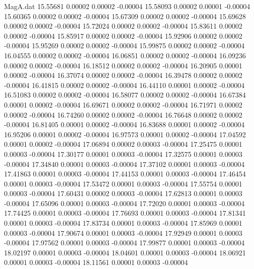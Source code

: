 \begin{filecontents}{MagA.dat}
  15.55681    0.00002    0.00002   -0.00004
  15.58093    0.00002    0.00001   -0.00004
  15.60365    0.00002    0.00002   -0.00004
  15.67309    0.00002    0.00002   -0.00004
  15.69628    0.00002    0.00002   -0.00004
  15.72024    0.00002    0.00002   -0.00004
  15.83611    0.00002    0.00002   -0.00004
  15.85917    0.00002    0.00002   -0.00004
  15.92906    0.00002    0.00002   -0.00004
  15.95269    0.00002    0.00002   -0.00004
  15.99875    0.00002    0.00002   -0.00004
  16.04555    0.00002    0.00002   -0.00004
  16.06851    0.00002    0.00002   -0.00004
  16.09236    0.00002    0.00002   -0.00004
  16.18512    0.00002    0.00002   -0.00004
  16.20905    0.00001    0.00002   -0.00004
  16.37074    0.00002    0.00002   -0.00004
  16.39478    0.00002    0.00002   -0.00004
  16.41815    0.00002    0.00002   -0.00004
  16.44110    0.00001    0.00002   -0.00004
  16.51083    0.00002    0.00002   -0.00004
  16.58077    0.00002    0.00002   -0.00004
  16.67384    0.00001    0.00002   -0.00004
  16.69671    0.00002    0.00002   -0.00004
  16.71971    0.00002    0.00002   -0.00004
  16.74260    0.00002    0.00002   -0.00004
  16.76648    0.00002    0.00002   -0.00004
  16.81405    0.00001    0.00002   -0.00004
  16.83688    0.00001    0.00002   -0.00004
  16.95206    0.00001    0.00002   -0.00004
  16.97573    0.00001    0.00002   -0.00004
  17.04592    0.00001    0.00002   -0.00004
  17.06894    0.00002    0.00003   -0.00004
  17.25475    0.00001    0.00003   -0.00004
  17.30177    0.00001    0.00003   -0.00004
  17.32575    0.00001    0.00003   -0.00004
  17.34840    0.00001    0.00003   -0.00004
  17.37102    0.00001    0.00003   -0.00004
  17.41863    0.00001    0.00003   -0.00004
  17.44153    0.00001    0.00003   -0.00004
  17.46454    0.00001    0.00003   -0.00004
  17.53472    0.00001    0.00003   -0.00004
  17.55754    0.00001    0.00003   -0.00004
  17.60431    0.00002    0.00003   -0.00004
  17.62813    0.00001    0.00003   -0.00004
  17.65096    0.00001    0.00003   -0.00004
  17.72020    0.00001    0.00003   -0.00004
  17.74425    0.00001    0.00003   -0.00004
  17.76693    0.00001    0.00003   -0.00004
  17.81341    0.00001    0.00003   -0.00004
  17.83734    0.00001    0.00003   -0.00004
  17.85969    0.00001    0.00003   -0.00004
  17.90674    0.00001    0.00003   -0.00004
  17.92949    0.00001    0.00003   -0.00004
  17.97562    0.00001    0.00003   -0.00004
  17.99877    0.00001    0.00003   -0.00004
  18.02197    0.00001    0.00003   -0.00004
  18.04601    0.00001    0.00003   -0.00004
  18.06921    0.00001    0.00003   -0.00004
  18.11561    0.00001    0.00003   -0.00004

\end{filecontents}
